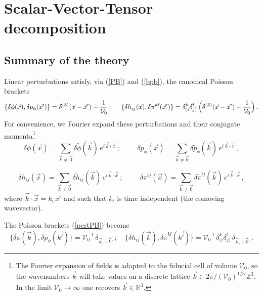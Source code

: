 \documentclass[11pt,tightenlines,eqsecnum,floats,aps,amsmath,amssymb,nofootinbib,prd,floatfix]{revtex4}
\def\t{\tilde}
\def\dpp{\delta p_{\phi}}
\def\dph{\delta\phi}
\def\t{\tilde}
\newcommand{\be}{\nopagebreak[3]\begin{equation}}
\newcommand{\ee}{\end{equation}}
\def\v{\vec}
\newcommand{\<}{\langle}
\renewcommand{\>}{\rangle}
\begin{document}
\section{Scalar-Vector-Tensor decomposition} \label{sec:SVT}
\subsection{Summary of the theory}

Linear  perturbations satisfy, via  (\ref{PB}) and (\ref{bpb}), the canonical Poisson brackets
%
\be \label{pertPB} \{ \dph (\vec{x}),\dpp (\vec{x}')\}=\delta^{(3)}(\vec{x}-\vec{x}')-\frac{1}{\mathcal{V}_0}\, 
;\hspace{0.5cm} \{ \delta h_{ij}(\vec{x}),\delta \pi^{k l}(\vec{x}')\}=\delta_{(i}^k\delta_{j)}^{l}\, \Big(\delta^{(3)}(\vec{x}-\vec{x}')-\frac{1}{\mathcal{V}_0}\Big)\, .\ee
%
For convenience, we Fourier expand these perturbations and their conjugate  momenta\footnote{The Fourier expansion of fields is adapted to the fiducial cell of volume $\mathcal{V}_0$, so the wavenumbers $\vec k$ will take values on a discrete lattice $\vec k\in 2\pi/(\mathcal{V}_0)^{1/3}\, \mathbb{Z}^3$. In the limit $\mathcal{V}_0\to\infty$ one recovers $\vec k\in \mathbb{R}^3$.}
%
\be \delta \phi(\vec{x})=\sum_{\vec{k}\neq \v0} \delta \t{\phi}(\vec{k})\, e^{i\, \v{k}\cdot\v{x}}\, ; \hspace{1cm} \delta p_{\phi}(\vec{x})=\sum_{\vec{k}\neq \v 0} \delta \t{p}_{\phi}(\vec{k})\, e^{i\, \v{k}\cdot\v{x}}\, ,\ee

\be \label{Fexph} \delta h_{ij}(\vec{x})=\sum_{\vec{k}\neq \v 0} \delta \t{h}_{ij}(\vec{k})\, e^{i\, \v{k}\cdot\v{x}}\, ; \hspace{1cm} \delta \pi^{ij}(\vec{x})=\sum_{\vec{k}\neq \v 0} \delta \t{\pi}^{ij}(\vec{k})\, e^{i\, \v{k}\cdot\v{x}}\, ,\ee %
where $\v{k}\cdot\v{x}=k_i\,x^i$ and such that $k_i$ is time independent (the comoving wavevector). 

The Poisson brackets (\ref{pertPB}) become
 \be\label{cpb} \{ \delta  \t \phi(\vec{k}),\delta \t p_{\phi}(\vec{k'})\}=\mathcal{V}_0^{-1}\, \delta_{\vec{k},-\vec{k}'}\,; \quad \{ \delta  \t h_{ij}(\vec{k}),\delta \t \pi^{k l}(\vec{k'})\}=\mathcal{V}_0^{-1}\, \delta_{(i}^k\delta_{j)}^{l}\,  \delta_{\vec{k},-\vec{k}'}\, .\ee
\end{document}
